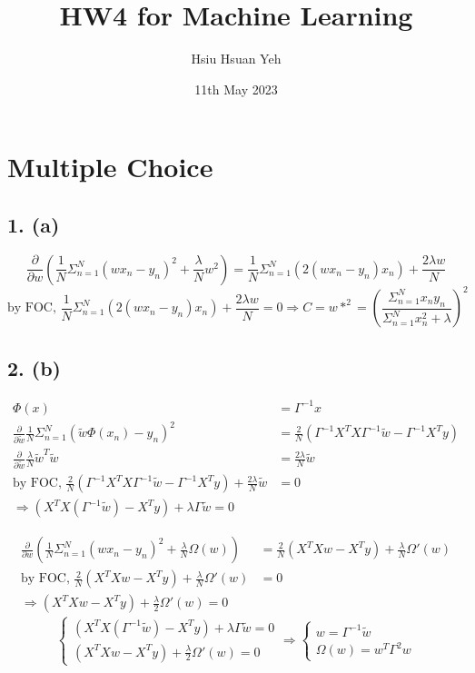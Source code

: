 \documentclass[12pt,a4paper]{article}
\title{ HW4 for Machine Learning }
\author{ Hsiu Hsuan Yeh }
\date{ 11th May 2023 }
\begin{document}
\maketitle

\section{Multiple Choice}
\subsection{1. (a)}
\[
\frac{ \partial }{ \partial w } ( \frac{1}{N}\Sigma_{n=1}^N (wx_n - y_n)^2 + \frac{\lambda}{N}w^2 )
= \frac{1}{N}\Sigma_{n=1}^N (2(wx_n-y_n)x_n) + \frac{2\lambda w}{N}
\]
\[
\text{by FOC, } \frac{1}{N}\Sigma_{n=1}^N (2(wx_n-y_n)x_n) + \frac{2\lambda w}{N} = 0
\Rightarrow C 
= w\ast^2 = (\frac{ \Sigma_{n=1}^N x_ny_n }{ \Sigma_{n=1}^N x_n^2+\lambda} )^2
\]
\subsection{2. (b)}

\begin{align}
    \Phi(x) &= \Gamma^{-1}x \\
    \frac{\partial}{\partial \tilde{w}} \frac{1}{N}\Sigma_{n=1}^N (\tilde{w}\Phi(x_n)-y_n)^2
    &= \frac{2}{N} ( \Gamma^{-1}X^TX\Gamma^{-1}\tilde{w} - \Gamma^{-1}X^Ty ) \\
    \frac{\partial}{\partial \tilde{w}} \frac{\lambda}{N}\tilde{w}^T\tilde{w}
    &= \frac{2\lambda}{N} \tilde{w} \\
    \text{by FOC, } \frac{2}{N} ( \Gamma^{-1}X^TX\Gamma^{-1}\tilde{w} - \Gamma^{-1}X^Ty ) + \frac{2\lambda}{N} \tilde{w} 
    &= 0 \\
    \Rightarrow (X^TX(\Gamma^{-1}\tilde{w}) - X^Ty) + \lambda\Gamma\tilde{w} = 0
\end{align}

\begin{align}
    \frac{\partial}{\partial w} ( \frac{1}{N}\Sigma_{n=1}^N (wx_n-y_n)^2 + \frac{\lambda}{N}\Omega(w) )
    &= \frac{2}{N} (X^TXw - X^Ty) + \frac{\lambda}{N} \Omega'(w) \\
    \text{by FOC, } \frac{2}{N} (X^TXw - X^Ty) + \frac{\lambda}{N} \Omega'(w) 
    &= 0 \\
    \Rightarrow (X^TXw - X^Ty) + \frac{\lambda}{2} \Omega'(w)= 0
\end{align}
\[
\begin{cases}
    (X^TX(\Gamma^{-1}\tilde{w}) - X^Ty) + \lambda\Gamma\tilde{w} = 0 \\
    (X^TXw - X^Ty) + \frac{\lambda}{2}\Omega'(w) = 0
\end{cases}
\Rightarrow
\begin{cases}
    w = \Gamma^{-1}\tilde{w} \\
    \Omega(w) = w^T\Gamma^2w
\end{cases}
\]
\end{document}
